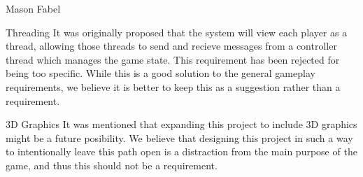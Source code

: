 \documentclass[12pt]{report}
\begin{document}
\begin{section}{Mason Fabel}
\begin{subsection}{Threading}
It was originally proposed that the system will view each player as a
thread, allowing those threads to send and recieve messages from a
controller thread which manages the game state. This requirement has been
rejected for being too specific. While this is a good solution to the
general gameplay requirements, we believe it is better to keep this as a
suggestion rather than a requirement.
\end{subsection}

\begin{subsection}{3D Graphics}
It was mentioned that expanding this project to include 3D graphics might
be a future posibility. We believe that designing this project in such a
way to intentionally leave this path open is a distraction from the main
purpose of the game, and thus this should not be a requirement.
\end{subsection}
\end{section}
\end{document}
